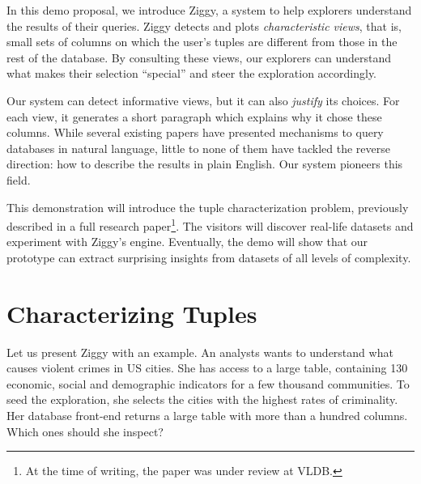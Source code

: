 In this demo proposal, we introduce Ziggy, a system to help explorers
understand the results of their queries.  Ziggy detects and plots
\emph{characteristic views}, that is, small sets of columns on which the user's
tuples are different from those in the rest of the database.  By consulting
these views, our explorers can understand what makes their selection
``special'' and steer the exploration accordingly. 

Our system can detect informative views, but it can also \emph{justify} its
choices.  For each view, it generates a short paragraph which explains why it
chose these columns.  While several existing papers have presented mechanisms
to query databases in natural language, little to none of them have tackled the
reverse direction: how to describe the results in plain English. Our system
pioneers this field.

This demonstration will introduce the tuple characterization problem,
previously described in a full research paper\footnote{At the time of writing,
the paper was under review at VLDB.}.  The visitors will discover real-life
datasets and experiment with Ziggy's engine.  Eventually, the demo will show
that our prototype can extract surprising insights from datasets of all levels
of complexity.
\pagebreak

\section{Characterizing Tuples}
\label{sec:overview}

Let us present Ziggy with an example. An analysts wants to understand what
causes violent crimes in US cities. She has access to a large table, containing
130 economic, social and demographic indicators for a few thousand communities. To
seed the exploration, she selects the cities with the highest rates of
criminality. Her database front-end returns a large table with more than a
hundred columns. Which ones should she inspect?


